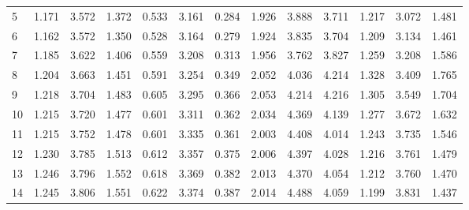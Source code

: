 \begin{tabular}{lrrrrrrrrrrrr}
	5                   & 1.171                          & 3.572                        & 1.372                        & 0.533                      & 3.161 & 0.284     & 1.926         & 3.888 & 3.711     & 1.217         & 3.072 & 1.481     \\
	6                   & 1.162                          & 3.572                        & 1.350                        & 0.528                      & 3.164 & 0.279     & 1.924         & 3.835 & 3.704     & 1.209         & 3.134 & 1.461     \\
	7                   & 1.185                          & 3.622                        & 1.406                        & 0.559                      & 3.208 & 0.313     & 1.956         & 3.762 & 3.827     & 1.259         & 3.208 & 1.586     \\
	8                   & 1.204                          & 3.663                        & 1.451                        & 0.591                      & 3.254 & 0.349     & 2.052         & 4.036 & 4.214     & 1.328         & 3.409 & 1.765     \\
	9                   & 1.218                          & 3.704                        & 1.483                        & 0.605                      & 3.295 & 0.366     & 2.053         & 4.214 & 4.216     & 1.305         & 3.549 & 1.704     \\
	10                  & 1.215                          & 3.720                        & 1.477                        & 0.601                      & 3.311 & 0.362     & 2.034         & 4.369 & 4.139     & 1.277         & 3.672 & 1.632     \\
	11                  & 1.215                          & 3.752                        & 1.478                        & 0.601                      & 3.335 & 0.361     & 2.003         & 4.408 & 4.014     & 1.243         & 3.735 & 1.546     \\
	12                  & 1.230                          & 3.785                        & 1.513                        & 0.612                      & 3.357 & 0.375     & 2.006         & 4.397 & 4.028     & 1.216         & 3.761 & 1.479     \\
	13                  & 1.246                          & 3.796                        & 1.552                        & 0.618                      & 3.369 & 0.382     & 2.013         & 4.370 & 4.054     & 1.212         & 3.760 & 1.470     \\
	14                  & 1.245                          & 3.806                        & 1.551                        & 0.622                      & 3.374 & 0.387     & 2.014         & 4.488 & 4.059     & 1.199         & 3.831 & 1.437     \\

\end{tabular}

